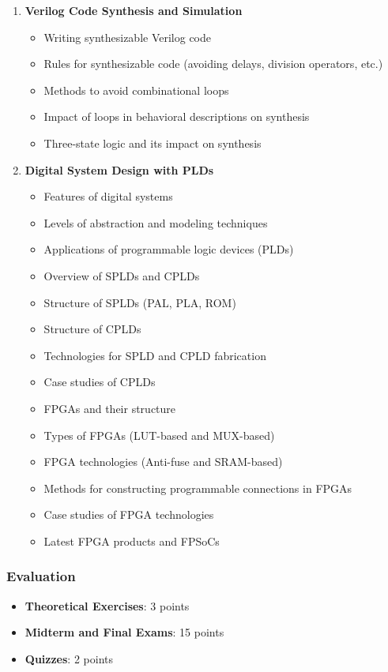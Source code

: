 \documentclass[12pt]{article}
\begin{document}
\begin{enumerate}
    \item \textbf{Verilog Code Synthesis and Simulation}
        \begin{itemize}
            \item Writing synthesizable Verilog code
            \item Rules for synthesizable code (avoiding delays, division operators, etc.)
            \item Methods to avoid combinational loops
            \item Impact of loops in behavioral descriptions on synthesis
            \item Three-state logic and its impact on synthesis
        \end{itemize}

    \item \textbf{Digital System Design with PLDs}
        \begin{itemize}
            \item Features of digital systems
            \item Levels of abstraction and modeling techniques
            \item Applications of programmable logic devices (PLDs)
            \item Overview of SPLDs and CPLDs
            \item Structure of SPLDs (PAL, PLA, ROM)
            \item Structure of CPLDs
            \item Technologies for SPLD and CPLD fabrication
            \item Case studies of CPLDs
            \item FPGAs and their structure
            \item Types of FPGAs (LUT-based and MUX-based)
            \item FPGA technologies (Anti-fuse and SRAM-based)
            \item Methods for constructing programmable connections in FPGAs
            \item Case studies of FPGA technologies
            \item Latest FPGA products and FPSoCs
        \end{itemize}
\end{enumerate}

\subsubsection*{Evaluation}
\begin{itemize}
    \item \textbf{Theoretical Exercises}: 3 points
    \item \textbf{Midterm and Final Exams}: 15 points
    \item \textbf{Quizzes}: 2 points
\end{itemize}
\end{document}
